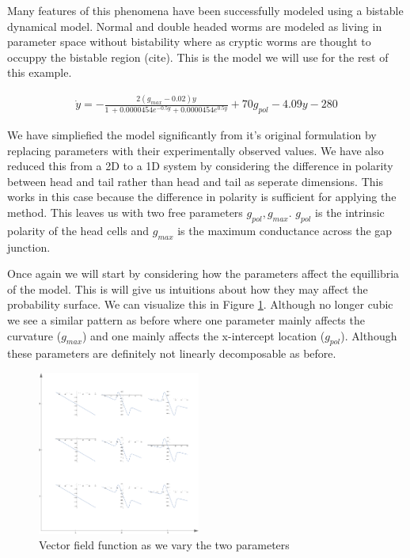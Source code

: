 \documentclass[letterpaper]{article}
\begin{document}
Many features of this phenomena have been successfully modeled using a bistable dynamical
model. Normal and double headed worms are modeled as living in parameter space without
bistability where as cryptic worms are thought to occuppy the bistable region (cite). 
This is the model we will use for the rest of this example.

\begin{eqnarray}
  \dot{y}=-\frac{2 (g_{max}-0.02) y}{1\, +0.0000454 e^{-0.5 y}
  +0.0000454 e^{0.5 y}}+70 g_{pol}-4.09 y-280
\end{eqnarray}

We have simpliefied the model significantly from it's original formulation by replacing
parameters with their experimentally observed values. We have also reduced this from a 
2D to a 1D system by considering the difference in polarity 
between head and tail rather
than head and tail as seperate dimensions. This works in this case 
because the difference
in polarity is sufficient for applying the method.
This leaves us with two free parameters
$g_{pol},g_{max}$. $g_{pol}$ is the intrinsic polarity of the head cells
and $g_{max}$ is the maximum conductance across the gap junction.

Once again we will start by considering how the parameters affect the equillibria of
the model. This is will give us intuitions about how they may affect the probability
surface. We can visualize this in Figure \ref{fig7}. Although no longer cubic we 
see a similar pattern as before where one parameter mainly affects the curvature 
($g_{max}$)
and one mainly affects the x-intercept location ($g_{pol}$). 
Although these parameters are 
definitely not linearly decomposable as before.

\begin{figure}[t]
\begin{center}
\includegraphics[width=2.1in,angle=0]{./worm_params.png}
\caption{Vector field function as we vary the two parameters}
\label{fig7}
\end{center}
\end{figure}
\end{document}
